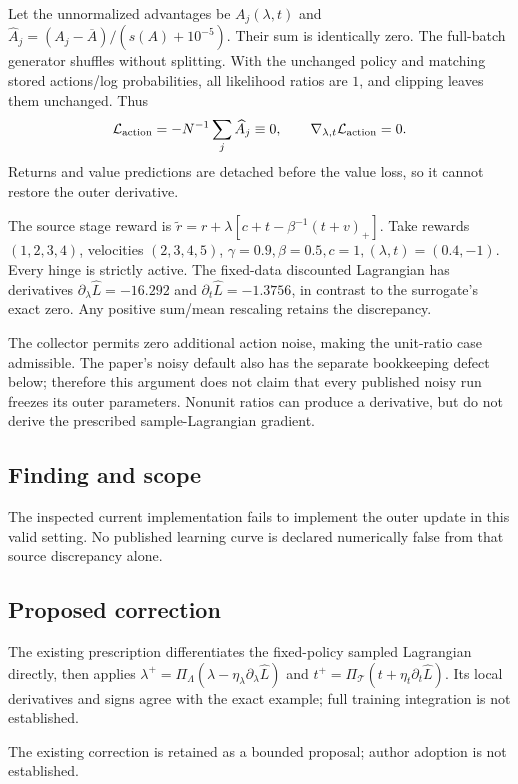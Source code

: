 \documentclass[11pt]{article}
\begin{document}
Let the unnormalized advantages be \(A_j(\lambda,t)\) and \(\widehat A_j=(A_j-\overline A)/(s(A)+10^{-5})\). Their sum is identically zero. The full-batch generator shuffles without splitting. With the unchanged policy and matching stored actions/log probabilities, all likelihood ratios are \(1\), and clipping leaves them unchanged. Thus \[\mathcal L_{\rm action}=-N^{-1}\sum_j\widehat A_j\equiv0,\qquad\nabla_{\lambda,t}\mathcal L_{\rm action}=0.\] Returns and value predictions are detached before the value loss, so it cannot restore the outer derivative.

The source stage reward is \(\widetilde r=r+\lambda[c+t-\beta^{-1}(t+v)_+]\). Take rewards \((1,2,3,4)\), velocities \((2,3,4,5)\), \(\gamma=0.9,\beta=0.5,c=1,(\lambda,t)=(0.4,-1)\). Every hinge is strictly active. The fixed-data discounted Lagrangian has derivatives \(\partial_\lambda\widehat L=-16.292\) and \(\partial_t\widehat L=-1.3756\), in contrast to the surrogate’s exact zero. Any positive sum/mean rescaling retains the discrepancy.

The collector permits zero additional action noise, making the unit-ratio case admissible. The paper’s noisy default also has the separate bookkeeping defect below; therefore this argument does not claim that every published noisy run freezes its outer parameters. Nonunit ratios can produce a derivative, but do not derive the prescribed sample-Lagrangian gradient.

\subsection*{Finding and scope}

The inspected current implementation fails to implement the outer update in this valid setting. No published learning curve is declared numerically false from that source discrepancy alone.

\subsection*{Proposed correction}

The existing prescription differentiates the fixed-policy sampled Lagrangian directly, then applies \(\lambda^+=\Pi_\Lambda(\lambda-\eta_\lambda\partial_\lambda\widehat L)\) and \(t^+=\Pi_{\mathcal T}(t+\eta_t\partial_t\widehat L)\). Its local derivatives and signs agree with the exact example; full training integration is not established.

The existing correction is retained as a bounded proposal; author adoption is not established.
\end{document}
